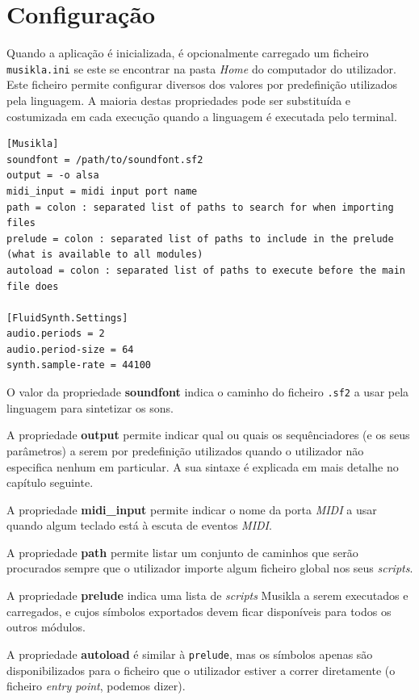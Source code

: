 \section{Configuração}
Quando a aplicação é inicializada, é opcionalmente carregado um ficheiro \texttt{musikla.ini} se este se encontrar na pasta \textit{Home} do computador do utilizador. Este ficheiro permite configurar diversos dos valores por predefinição utilizados pela linguagem. A maioria destas propriedades pode ser substituída e costumizada em cada execução quando a linguagem é executada pelo terminal.

\begin{lstlisting}[caption={Exemplo de um ficheiro de configuração da linguagem},label={lst:configuration-file}]
[Musikla]
soundfont = /path/to/soundfont.sf2
output = -o alsa
midi_input = midi input port name
path = colon : separated list of paths to search for when importing files
prelude = colon : separated list of paths to include in the prelude (what is available to all modules)
autoload = colon : separated list of paths to execute before the main file does

[FluidSynth.Settings]
audio.periods = 2
audio.period-size = 64
synth.sample-rate = 44100
\end{lstlisting}

O valor da propriedade \textbf{soundfont} indica o caminho do ficheiro \texttt{.sf2} a usar pela linguagem para sintetizar os sons.

A propriedade \textbf{output} permite indicar qual ou quais os sequênciadores (e os seus parâmetros) a serem por predefinição utilizados quando o utilizador não especifica nenhum em particular. A sua sintaxe é explicada em mais detalhe no capítulo seguinte.

A propriedade \textbf{midi\_input} permite indicar o nome da porta \textit{MIDI} a usar quando algum teclado está à escuta de eventos \textit{MIDI}.

A propriedade \textbf{path} permite listar um conjunto de caminhos que serão procurados sempre que o utilizador importe algum ficheiro global nos seus \textit{scripts}.

A propriedade \textbf{prelude} indica uma lista de \textit{scripts} Musikla a serem executados e carregados, e cujos símbolos exportados devem ficar disponíveis para todos os outros módulos.

A propriedade \textbf{autoload} é similar à \texttt{prelude}, mas os símbolos apenas são disponibilizados para o ficheiro que o utilizador estiver a correr diretamente (o ficheiro \textit{entry point}, podemos dizer).

